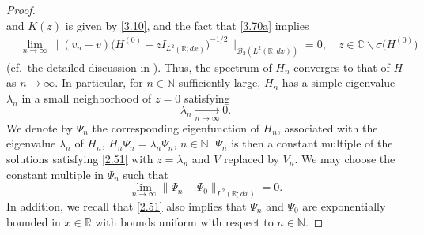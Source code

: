 \begin{proof}
\begin{equation}
\end{equation}
and $K(z)$ is given by \eqref{3.10}, and the fact that \eqref{3.70a} implies
\begin{align}
&\lim_{n\to\infty}\big\|(v_n -v) \big(H^{(0)} - z I_{L^2({{\mathbb{R}}};dx)}\big)^{-1/2}
  \big\|_{{{\mathcal B}}_2(L^2({{\mathbb{R}}};dx))} =0, \quad z\in
{{\mathbb{C}}}\backslash\sigma\big(H^{(0)}\big)
\end{align}
(cf.\ the detailed discussion in \cite{GM04}). Thus, the spectrum of
$H_n$ converges to that of $H$ as $n\to\infty$. In particular, for
$n\in{{\mathbb{N}}}$ sufficiently large, $H_n$ has a simple  eigenvalue
$\lambda_n$ in a small neighborhood of $z=0$ satisfying
\begin{equation}
\lambda_n \underset{n\to\infty}{\longrightarrow} 0.
\end{equation}
We denote by $\Psi_n$ the corresponding eigenfunction of $H_n$,
associated with the eigenvalue $\lambda_n$ of $H_n$, $H_n
\Psi_n=\lambda_n \Psi_n$, $n\in{{\mathbb{N}}}$. $\Psi_n$ is then a constant
multiple of the solutions satisfying \eqref{2.51} with $z=\lambda_n$
and $V$ replaced by $V_n$. We may choose the constant multiple in
$\Psi_n$ such that
\begin{equation}
\lim_{n\to \infty}\|\Psi_n - \Psi_0\|_{L^2({{\mathbb{R}}};dx)}=0.
\end{equation}
In addition, we recall that \eqref{2.51} also implies that $\Psi_n$
and $\Psi_0$ are exponentially bounded in $x\in{{\mathbb{R}}}$ with bounds
uniform with  respect to $n\in{{\mathbb{N}}}$.


\end{proof}
